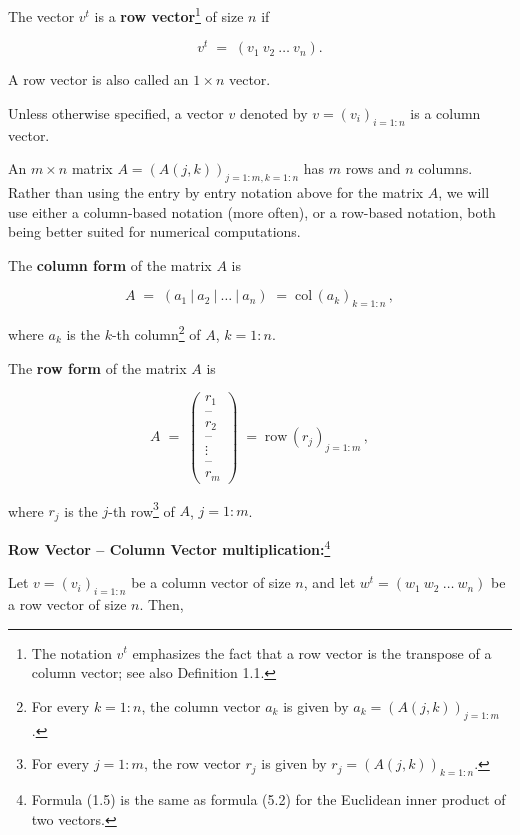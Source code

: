 The vector $v^t$ is a \textbf{row vector}\footnote{The notation $v^t$ emphasizes
the fact that a row vector is the transpose of a column vector; see also
Definition 1.1.} of size $n$ if

\begin{equation}
v^t \;=\; (v_1\ v_2\ \ldots\ v_n).
\end{equation}

A row vector is also called an $1\times n$ vector.

Unless otherwise specified, a vector $v$ denoted by $v=(v_i)_{i=1:n}$ is a
column vector.

An $m\times n$ matrix $A=(A(j,k))_{j=1:m,k=1:n}$ has $m$ rows and $n$ columns.
Rather than using the entry by entry notation above for the matrix $A$, we
will use either a column-based notation (more often), or a row-based
notation, both being better suited for numerical computations.

The \textbf{column form} of the matrix $A$ is

\begin{equation}
A \;=\; (a_1\ |\ a_2\ |\ \ldots\ |\ a_n) \;=\; \mathrm{col}\,(a_k)_{k=1:n}\,,
\end{equation}

where $a_k$ is the $k$-th column\footnote{For every $k=1:n$, the column
vector $a_k$ is given by $a_k=(A(j,k))_{j=1:m}$.} of $A$, $k=1:n$.

The \textbf{row form} of the matrix $A$ is

\begin{equation}
A \;=\; \begin{pmatrix} r_1 \\ \text{--} \\ r_2 \\ \text{--} \\ \vdots \\ \text{--} \\ r_m \end{pmatrix}
\;=\; \mathrm{row}\,(r_j)_{j=1:m}\,,
\end{equation}

where $r_j$ is the $j$-th row\footnote{For every $j=1:m$, the row vector
$r_j$ is given by $r_j=(A(j,k))_{k=1:n}$.} of $A$, $j=1:m$.

\medskip\noindent\textbf{Row Vector -- Column Vector multiplication:}\footnote{Formula
(1.5) is the same as formula (5.2) for the Euclidean inner product of two
vectors.}\par
Let $v=(v_i)_{i=1:n}$ be a column vector of size $n$, and let
$w^t=(w_1\ w_2\ \ldots\ w_n)$ be a row vector of size $n$. Then,

